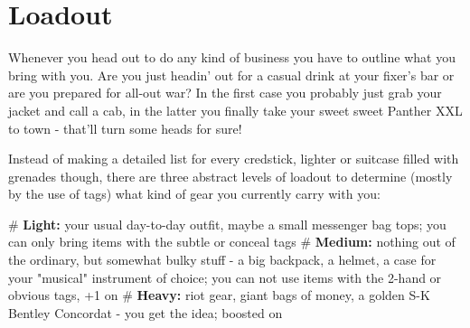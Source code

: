 \section{Loadout}

Whenever you head out to do any kind of business you have to outline what you bring with you. Are you just headin' out for a casual drink at your fixer's bar or are you prepared for all-out war? In the first case you probably just grab your jacket and call a cab, in the latter you finally take your sweet sweet Panther XXL to town - that'll turn some heads for sure!

Instead of making a detailed list for every credstick, lighter or suitcase filled with grenades though, there are three abstract levels of loadout to determine (mostly by the use of \refname{tags}) what kind of gear you currently carry with you:

\begin{easylist}
    # \textbf{Light:} your usual day-to-day outfit, maybe a small messenger bag tops; you can only bring items with the \textsf{subtle} or \textsf{conceal} tags
    # \textbf{Medium:} nothing out of the ordinary, but somewhat bulky stuff - a big backpack, a helmet, a case for your "musical" instrument of choice; you can not use items with the \textsf{2-hand} or \textsf{obvious} tags, +1 on 
    # \textbf{Heavy:} riot gear, giant bags of money, a golden S-K Bentley Concordat - you get the idea; boosted on 
\end{easylist}
